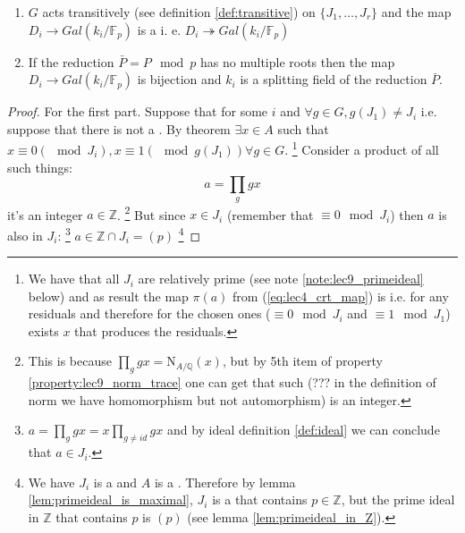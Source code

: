 \begin{theorem}
  \begin{enumerate}
  \item $G$ acts transitively (see definition \ref{def:transitive}) on
    $\{J_1, \dots, J_r\}$ and the map
    $D_i \to Gal\left(k_i/\mathbb{F}_p\right)$ is a
     i. e.
    $D_i \twoheadrightarrow Gal\left(k_i/\mathbb{F}_p\right)$
    \item If the reduction $\bar{P} = P \mod p$ has no multiple roots
      then the map $D_i \to Gal\left(k_i/\mathbb{F}_p\right)$ is
      bijection and $k_i$ is a splitting field of the reduction
      $\bar{P}$. 
  \end{enumerate}
  \begin{proof}
    For the first part. Suppose that for some $i$ and $\forall g \in G,
    g\left(J_1\right) \ne J_i$ i.e. suppose that there is not a
    . By  theorem
    $\exists x \in A$ such that
    $x \equiv 0 (\mod J_i),  x \equiv 1 (\mod g\left(J_1\right))
    \forall g \in G$.
    \footnote{
      We have that all $J_i$ are relatively prime (see note
      \ref{note:lec9_primeideal} below) and as result 
      the map $\pi\left(a\right)$ from (\ref{eq:lec4_crt_map}) is
      i.e. for any residuals and therefore for the chosen ones
      ($\equiv 0 \mod J_i$ and $\equiv 1 \mod J_1$) exists $x$ that
      produces the residuals. 
    }
    Consider a product of all such things:
    \[
    a = \prod_{g} g x
    \]
    it's an integer $a \in \mathbb{Z}$.
    \footnote{
      This is because $\prod_{g} g x =
      \mathrm{N}_{A/\mathbb{Q}}\left(x\right)$, but by 5th item of
      property \ref{property:lec9_norm_trace} one can get that such
      (??? in the definition of norm we have homomorphism but not
      automorphism)
      is an integer.       
    }
    But since $x \in J_i$
    (remember that $\equiv 0 \mod J_i$)
    then $a$
    is also in $J_i$:
    \footnote{
      $a = \prod_{g} g x = x \prod_{g \ne id} g x$ and by ideal
      definition \ref{def:ideal} we can conclude that $a \in J_i$.
    }
    $a \in \mathbb{Z} \cap J_i = (p)$
    \footnote{
      We have $J_i$ is a  and $A$ is a
      . Therefore by lemma \ref{lem:primeideal_is_maximal},
      $J_i$ is a 
      that contains $p  
      \in \mathbb{Z}$, but the prime ideal in $\mathbb{Z}$ that
      contains $p$ is $(p)$ (see lemma \ref{lem:primeideal_in_Z}).
}
\end{proof}
\end{theorem}
